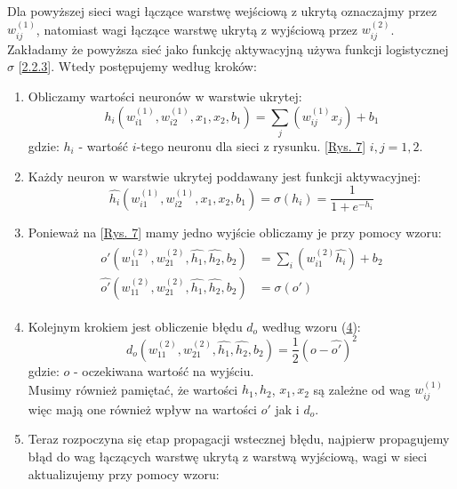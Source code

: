 \documentclass{article}
\begin{document}
Dla powyższej sieci wagi łączące warstwę wejściową z ukrytą oznaczajmy przez 
$w_{ij}^{(1)}$, natomiast wagi łączące warstwę ukrytą z wyjściową przez 
$w_{ij}^{(2)}$. Zakładamy że powyższa sieć jako
funkcję aktywacyjną używa funkcji logistycznej $\sigma$ [\hyperref[sec:fa]{2.2.3}].
Wtedy postępujemy według kroków:\\
\begin{enumerate}
\item Obliczamy wartości neuronów  w warstwie ukrytej:
\begin{equation}
	h_i(w_{i1}^{(1)}, w_{i2}^{(1)}, x_1, x_2, b_1) = \sum_{j} (w_{ij}^{(1)}x_j) + b_1
\end{equation}
gdzie: $h_i$ - wartość $i$-tego neuronu dla sieci z rysunku.
[\hyperref[fig:ex]{Rys. 7}] $i, j = 1, 2$.
\item Każdy neuron w warstwie ukrytej poddawany jest funkcji aktywacyjnej:
\begin{equation}
	\hat{h_i}(w_{i1}^{(1)}, w_{i2}^{(1)}, x_1, x_2, b_1) = \sigma(h_i) = \frac{1}{1 + e^{-h_i}}
\end{equation}
\item Ponieważ na [\hyperref[fig:ex]{Rys. 7}] mamy jedno wyjście obliczamy je przy pomocy wzoru: \\
\begin{align}
\begin{split}
	o'(w_{11}^{(2)}, w_{21}^{(2)}, \hat{h_1}, \hat{h_2}, b_2) &= \sum_{i} (w_{i1}^{(2)}\hat{h_i}) + b_2\\
	\hat{o'}(w_{11}^{(2)}, w_{21}^{(2)}, \hat{h_1}, \hat{h_2}, b_2)&= \sigma(o')
\end{split}
\end{align}
\item Kolejnym krokiem jest obliczenie błędu $d_o$ według wzoru (\hyperref[wz:4]{4}):
\begin{equation}
	d_o(w_{11}^{(2)}, w_{21}^{(2)}, \hat{h_1}, \hat{h_2}, b_2) = \frac{1}{2}(o - \hat{o'})^2
\end{equation}
gdzie: $o$ - oczekiwana wartość na wyjściu.\\
Musimy również pamiętać, że wartości $h_1, h_2$, $x_1, x_2$ są zależne od wag $w_{ij}^{(1)}$ 
więc mają one również wpływ na wartości $o'$ jak i $d_o$.
\item Teraz rozpoczyna się etap propagacji wstecznej błędu, najpierw propagujemy błąd
do wag łączących warstwę ukrytą z warstwą wyjściową, wagi w sieci aktualizujemy przy pomocy wzoru:
\begin{equation}
\label{wz:8}

\end{equation}
\end{enumerate}
\end{document}
